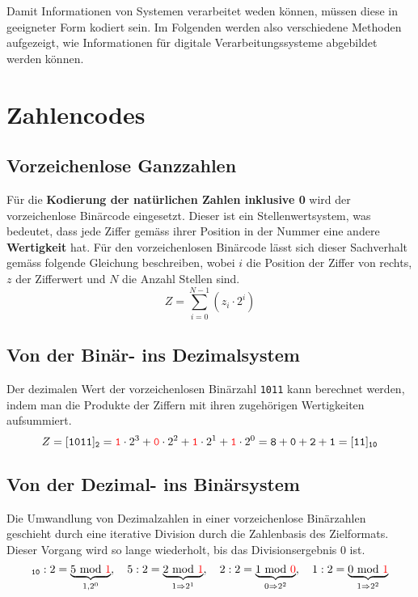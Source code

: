 Damit Informationen von Systemen verarbeitet weden können, müssen diese in geeigneter Form kodiert sein. Im Folgenden werden also verschiedene Methoden aufgezeigt, wie Informationen für digitale Verarbeitungssysteme abgebildet werden können. 
\section{Zahlencodes}
\subsection{Vorzeichenlose Ganzzahlen}
Für die {\color{red}\textbf{Kodierung der natürlichen Zahlen inklusive 0}} wird der vorzeichenlose Binärcode eingesetzt. Dieser ist ein Stellenwertsystem, was bedeutet, dass jede Ziffer gemäss ihrer Position in der Nummer eine andere {\color{red}\textbf{Wertigkeit}} hat. Für den vorzeichenlosen Binärcode lässt sich dieser Sachverhalt gemäss folgende Gleichung beschreiben, wobei $i$ die Position der Ziffer von rechts, $z$ der Zifferwert und $N$ die Anzahl Stellen sind.
\begin{equation}
\boxed{Z=\displaystyle \sum_{i=0}^{N-1}\left(z_i\cdot 2^i\right)}
\end{equation}
\subsection{Von der Binär- ins Dezimalsystem}
Der dezimalen Wert der vorzeichenlosen Binärzahl {\color{red}\texttt{1011}} kann berechnet werden, indem man die Produkte der Ziffern mit ihren zugehörigen Wertigkeiten aufsummiert.
\begin{equation*}
Z=[\texttt{1011}]_{\texttt{2}}={\color{red}\texttt{1}}\cdot 2^3+{\color{red}\texttt{0}}\cdot 2^2+{\color{red}\texttt{1}}\cdot 2^1+{\color{red}\texttt{1}}\cdot 2^0=\texttt{8}+\texttt{0}+\texttt{2}+\texttt{1}=[\texttt{11}]_{\texttt{10}}
\end{equation*}
\subsection{Von der Dezimal- ins Binärsystem}
Die Umwandlung von Dezimalzahlen in einer vorzeichenlose Binärzahlen geschieht durch eine iterative Division durch die Zahlenbasis des Zielformats. Dieser Vorgang wird so lange wiederholt, bis das Divisionsergebnis 0 ist.
\begin{equation*}
[\texttt{11}]_{\texttt{10}}:2=\underbrace{5\text{ mod } {\color{red}1}}_{1, 2^0},\quad 5:2=\underbrace{2\text{ mod }{\color{red}1}}_{1\Rightarrow 2^1},\quad 2:2=\underbrace{1\text{ mod }{\color{red}0}}_{0\Rightarrow 2^2},\quad 1:2=\underbrace{0\text{ mod }{\color{red}1}}_{1\Rightarrow 2^2}
\end{equation*}

